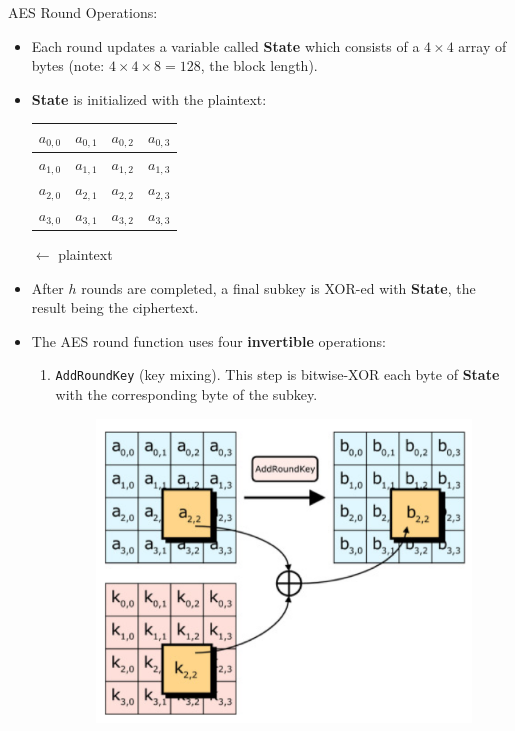 \documentclass[12pt,titlepage]{article}
\begin{document}
AES Round Operations: \begin{itemize}
\item Each round updates a variable called \textbf{State} which consists of a $4 \times 4$ array of bytes (note: $4 \times 4 \times 8 = 128$, the block length). 
\item \textbf{State} is initialized with the plaintext: \begin{center}
\begin{tabular}{|c|c|c|c|}
	\hline
	$a_{0, 0}$ & $a_{0, 1}$ & $a_{0, 2}$ & $a_{0, 3}$ \\
	\hline
	$a_{1, 0}$ & $a_{1, 1}$ & $a_{1, 2}$ & $a_{1, 3}$ \\
	\hline
	$a_{2, 0}$ & $a_{2, 1}$ & $a_{2, 2}$ & $a_{2, 3}$ \\
	\hline
	$a_{3, 0}$ & $a_{3, 1}$ & $a_{3, 2}$ & $a_{3, 3}$ \\
	\hline
\end{tabular} $ \leftarrow $ plaintext
\end{center}
\item After $h$ rounds are completed, a final subkey is XOR-ed with \textbf{State}, the result being the ciphertext.
\item The AES round function uses four \textbf{invertible} operations:\begin{enumerate}
\item \texttt{AddRoundKey} (key mixing). This step is bitwise-XOR each byte of \textbf{State} with the corresponding byte of the subkey.
\begin{center}
	\begin{figure}[h!]
		\includegraphics[width=\textwidth]{AES_Add_Round_Key.png}

\end{figure}
\end{center}
\end{enumerate}
\end{itemize}
\end{document}
